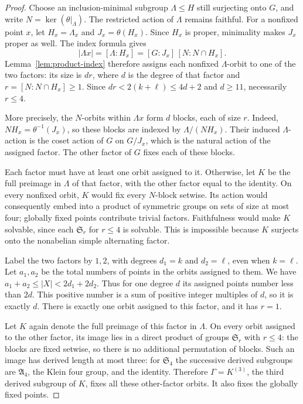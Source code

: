 \documentclass[11pt,a4paper]{article}
\theoremstyle{definition}
\theoremstyle{remark}
\newcommand{\Alt}{\mathfrak A}
\newcommand{\Sym}{\mathfrak S}
\begin{document}
\begin{proof}
Choose an inclusion-minimal subgroup $\Lambda\le H$ still surjecting
onto $G$, and write $N=\ker(\theta|_\Lambda)$. The restricted action
of $\Lambda$ remains faithful. For a nonfixed point $x$, let
$H_x=\Lambda_x$ and $J_x=\theta(H_x)$. Since $H_x$ is proper,
minimality makes $J_x$ proper as well. The index formula gives
\begin{equation}\label{eq:product-orbit-fibers}
 |\Lambda x|=[\Lambda:H_x]
   =[G:J_x]\,[N:N\cap H_x].
\end{equation}
Lemma~\ref{lem:product-index} therefore assigns each nonfixed
$\Lambda$-orbit to one of the two factors: its size is $dr$, where
$d$ is the degree of that factor and
$r=[N:N\cap H_x]\ge1$. Since
$dr<2(k+\ell)\le4d+2$ and $d\ge11$, necessarily $r\le4$.

More precisely, the $N$-orbits within $\Lambda x$ form $d$ blocks,
each of size $r$. Indeed, $NH_x=\theta^{-1}(J_x)$, so these blocks
are indexed by $\Lambda/(NH_x)$. Their induced $\Lambda$-action
is the coset action of $G$ on $G/J_x$, which is the natural action of the assigned factor.
The other factor of $G$ fixes each of these blocks.

Each factor must have at least one orbit assigned to it. Otherwise,
let $K$ be the full preimage in $\Lambda$ of that factor, with the
other factor equal to the identity. On every nonfixed orbit, $K$
would fix every $N$-block setwise. Its action would consequently embed
into a product of symmetric groups on sets of size at most four;
globally fixed points contribute trivial factors. Faithfulness would
make $K$ solvable, since each $\Sym_r$ for $r\le4$ is solvable. This is
impossible because $K$ surjects onto the nonabelian simple alternating
factor.

Label the two factors by $1,2$, with degrees $d_1=k$ and $d_2=\ell$,
even when $k=\ell$. Let $a_1,a_2$ be the total numbers of points
in the orbits assigned to them. We have
$a_1+a_2\le|X|<2d_1+2d_2$. Thus for one degree $d$ its assigned
points number less than $2d$. This positive number is a sum of positive
integer multiples of $d$, so it is exactly $d$. There is exactly one
orbit assigned to this factor, and it has $r=1$.

Let $K$ again denote the full preimage of this factor in $\Lambda$.
On every orbit assigned to the other factor, its image lies in a
direct product of groups $\Sym_r$ with $r\le4$: the blocks are
fixed setwise, so there is no additional permutation of blocks. Such
an image has derived
length at most three: for $\Sym_4$ the successive derived subgroups
are $\Alt_4$, the Klein four group, and the identity. Therefore
$\Gamma=K^{(3)}$, the third derived subgroup of $K$, fixes all these
other-factor orbits. It also fixes the globally fixed points.


\end{proof}
\end{document}
